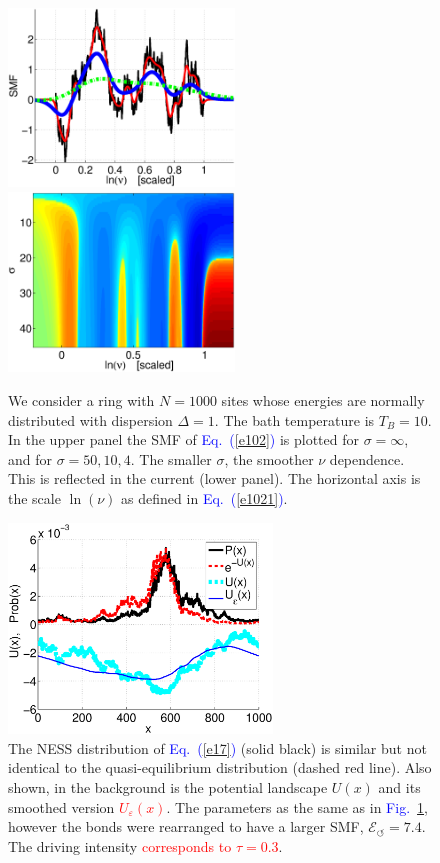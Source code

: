 \documentclass[aps,prl,floats,floatfix,twocolumn]{revtex4}
\newcommand{\Eq}[1]{\textcolor{blue}{Eq.\!\!~(\ref{#1})}}
\newcommand{\Fig}[1]{\textcolor{blue}{Fig.}\!\!~\ref{#1}}
\newcommand{\rmrk}[1]{\textcolor{red}{#1}}
\begin{document}
\begin{figure}
\includegraphics[width=6cm]{SMF_RW.eps}
\includegraphics[width=6cm]{I_sig_tau.eps}

\caption{
We consider a ring with ${N=1000}$ sites whose energies 
are normally distributed with dispersion ${\Delta=1}$.
The bath temperature is $T_B=10$. In the upper panel 
the SMF of \Eq{e102} is plotted for $\sigma=\infty$, 
and for $\sigma=50,10,4$. The smaller $\sigma$, 
the smoother $\nu$ dependence. 
This is reflected in the current (lower panel).  
The horizontal axis is the scale $\ln(\nu)$ as defined in \Eq{e1021}.} 
\label{f2}
\end{figure}



\begin{figure}
\includegraphics[width=7cm]{PvsV4}

\caption{
The NESS distribution of \Eq{e17} (solid black) 
is similar but not identical to the quasi-equilibrium 
distribution (dashed red line). 
Also shown, in the background is the potential 
landscape $U(x)$ and its smoothed version \rmrk{$U_{\varepsilon}(x)$}. 
The parameters as the same as in \Fig{f2}, 
however the bonds were rearranged to have a larger SMF, $\mathcal{E}_{\circlearrowleft}=7.4$.
The driving intensity \rmrk{corresponds to $\tau=0.3$}. }

\label{f3}
\end{figure}
\end{document}
